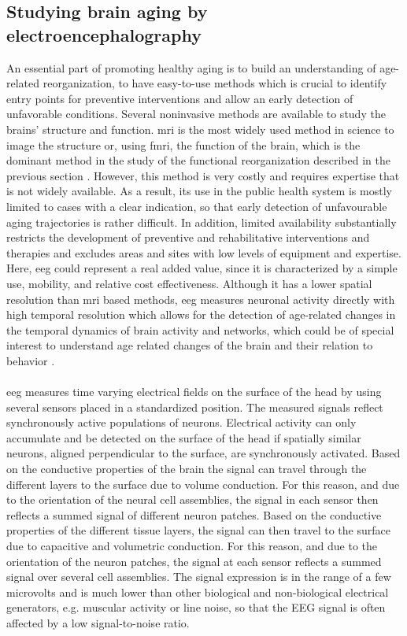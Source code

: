 \subsection{Studying brain aging by electroencephalography}
An essential part of promoting healthy aging is to build an understanding of age-related reorganization, to have easy-to-use methods which is crucial to identify entry points for preventive interventions and allow an early detection of unfavorable conditions. Several noninvasive methods are available to study the brains' structure and function. \Gls{mri} is the most widely used method in science to image the structure or, using \gls{fmri}, the function of the brain, which is the dominant method in the study of the functional reorganization described in the previous section \cite{Reuter-Lorenz2010}. However, this method is very costly and requires expertise that is not widely available. As a result, its use in the public health system is mostly limited to cases with a clear indication, so that early detection of unfavourable aging trajectories is rather difficult. In addition, limited availability substantially restricts the development of preventive and rehabilitative interventions and therapies and excludes areas and sites with low levels of equipment and expertise. Here, \gls{eeg} could represent a real added value, since it is characterized by a simple use, mobility, and relative cost effectiveness.  Although it has a lower spatial resolution than \gls{mri} based methods, \gls{eeg} measures neuronal activity directly with high temporal resolution which allows for the detection of age-related changes in the temporal dynamics of brain activity and networks, which could be of special interest to understand age related changes of the brain and their relation to behavior \cite{Courtney2021}.\\
\\
\Gls{eeg} measures time varying electrical fields on the surface of the head by using several sensors placed in a standardized position. The measured signals reflect synchronously active populations of  neurons. Electrical activity can only accumulate and be detected on the surface of the head if spatially similar neurons, aligned perpendicular to the surface, are synchronously activated. Based on the conductive properties of the brain the signal can travel through the different layers to the surface due to volume conduction. For this reason, and due to the orientation of the neural cell assemblies, the signal in each sensor then reflects a summed signal of different neuron patches. Based on the conductive properties of the different tissue layers, the signal can then travel to the surface due to capacitive and volumetric conduction. For this reason, and due to the orientation of the neuron patches, the signal at each sensor reflects a summed signal over several cell assemblies. The signal expression is in the range of a few microvolts and is much lower than other biological and non-biological electrical generators, e.g. muscular activity or line noise, so that the EEG signal is often affected by a low signal-to-noise ratio.\\
